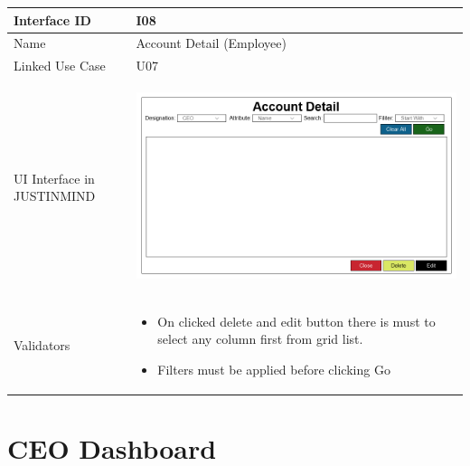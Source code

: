 \documentclass[12pt,a4paper]{report}
\begin{document}
\begin{tabular}{ | m{3cm} | m{12cm}| } \hline

Interface ID &  I08 \\\hline

Name  	      &  Account Detail (Employee) \\ \hline

Linked Use Case & U07 \\ \hline


UI Interface in JUSTINMIND & \begin{center} \includegraphics[scale=0.3]{./User Interface/UI-006 ViewAndDelete Account@1x.png}\end{center}  \\ \hline

Validators & 
\begin{itemize}
\item   On clicked delete and edit button there is must to select any column first from grid list. 
\item  Filters must be applied before clicking Go


\end{itemize}
\\ \hline

\end{tabular} 
\section{CEO Dashboard }
\end{document}
